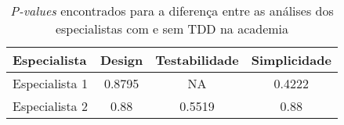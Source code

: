 \begin{table}[h!]
	\begin{tabular}{| p{5cm} | c | c | c | }
		\hline
		Especialista & Design & Testabilidade & Simplicidade\\
		\hline
		Especialista 1	& 0.8795 &	NA	& 0.4222\\
		Especialista 2	& 0.88	& 0.5519 &	0.88\\
		\hline
	\end{tabular}
	\caption{\textit{P-values} encontrados para a diferença entre as análises dos especialistas com e sem TDD na academia}
	\label{tab:especialistas-academia}
\end{table}
